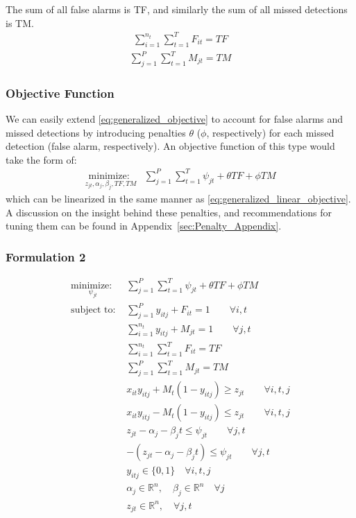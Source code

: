 \documentclass[journal]{IEEEtran}
\begin{document}
The sum of all false alarms is TF, and similarly the sum of all missed detections is TM. 
\begin{align}
\sum_{i=1}^{n_{t}} \sum_{t=1}^{T} F_{it} = TF
\end{align}
\begin{align}\label{eqn: MD Total}
\sum_{j=1}^{P} \sum_{t=1}^{T} M_{jt} = TM 
\end{align}

\subsubsection{Objective Function}
We can easily extend \eqref{eq:generalized_objective} to account for false alarms and missed detections by introducing penalties $\theta$ ($\phi$, respectively) for each missed detection (false alarm, respectively). An objective function of this type would take the form of: 
\begin{align}
\underset{z_{jt}, \alpha_{j}, \beta_{j},TF,TM}{\text{minimize: }} & \sum_{j=1}^{P} \sum_{t=1}^{T} \psi_{jt} + \theta TF + \phi TM
\end{align}
which can be linearized in the same manner as \eqref{eq:generalized_linear_objective}. A discussion on the insight behind these penalties, and recommendations for tuning them can be found in Appendix~\ref{sec:Penalty_Appendix}.

\subsubsection{Formulation 2}
\begin{align*}
\underset{\psi_{jt}}{\text{minimize: }} & \sum_{j=1}^{P} \sum_{t=1}^{T} \psi_{jt} + \theta TF + \phi TM\\
\text{subject to: }	& \sum_{j=1}^{P} y_{itj} + F_{it} = 1 \qquad \forall i,t\\
				& \sum_{i=1}^{n_{t}} y_{itj} + M_{jt} = 1 \qquad \forall j,t\\
				& \sum_{i=1}^{n_{t}} \sum_{t=1}^{T} F_{it} = TF\\
				& \sum_{j=1}^{P} \sum_{t=1}^{T} M_{jt} = TM\\
				& x_{it}y_{itj} + M_{t}(1-y_{itj}) \geq z_{jt} \qquad \forall i,t,j\\
				& x_{it}y_{itj} - M_{t}(1-y_{itj}) \leq z_{jt} \qquad \forall i,t,j\\
				& z_{jt} - \alpha_{j} - \beta_{j}t \leq \psi_{jt} \qquad \forall j,t\\
				& -(z_{jt} - \alpha_{j} - \beta_{j}t) \leq \psi_{jt} \qquad \forall j,t\\
				& y_{itj} \in \{0,1\} \quad \forall i,t,j\\
				& \alpha_{j} \in \mathbb{R}^n,\quad \beta_{j} \in \mathbb{R}^n \quad \forall j\\
				& z_{jt} \in \mathbb{R}^n, \quad \forall j,t
\end{align*}
\end{document}
